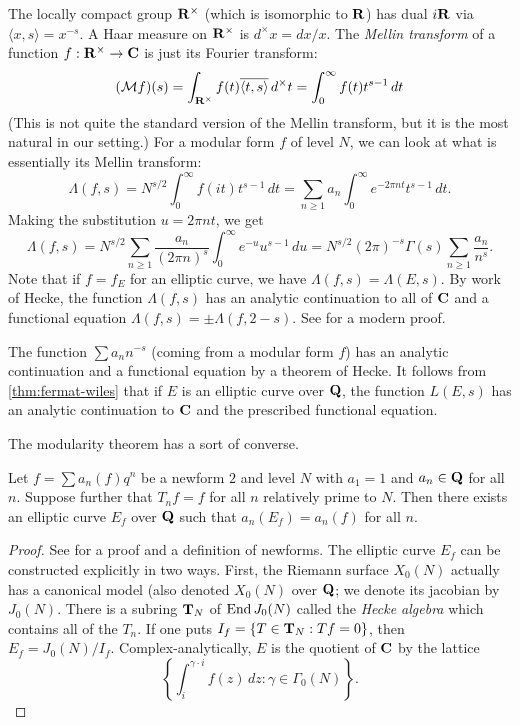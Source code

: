 The locally compact group $\mathbf{R}^\times$ (which is isomorphic to $\mathbf{R}$) has 
dual $i\mathbf{R}$ via $\langle x,s\rangle = x^{-s}$. A Haar measure on 
$\mathbf{R}^\times$ is $d^\times x=dx/x$. The \emph{Mellin transform} 
of a function $f:\mathbf{R}^\times\to \mathbf{C}$ is just its Fourier transform:
\[
  (\mathcal{M} f)(s) 
    = \int_{\mathbf{R}^\times} f(t) \overline{\langle t,s\rangle}\, d^\times t
    = \int_0^\infty f(t) t^{s-1}\, dt
\]
(This is not quite the standard version of the Mellin transform, but it is the 
most natural in our setting.) For a modular form $f$ of level $N$, we can look 
at what is essentially its Mellin transform: 
\[
  \Lambda(f,s) 
    = N^{s/2}\int_0^\infty f(i t) t^{s-1}\, dt  
    = \sum_{n\geqslant 1} a_n \int_0^\infty e^{-2\pi n t} t^{s-1}\,dt \text{.}
\]
Making the substitution $u=2\pi n t$, we get 
\[
  \Lambda(f,s) 
    = N^{s/2} \sum_{n\geqslant 1} \frac{a_n}{(2\pi n)^s} \int_0^\infty e^{-u} u^{s-1}\, du
    = N^{s/2}(2\pi)^{-s} \Gamma(s) \sum_{n\geqslant 1} \frac{a_n}{n^s} \text{.}
\]
Note that if $f=f_E$ for an elliptic curve, we have 
$\Lambda(f,s) = \Lambda(E,s)$. By work of Hecke, the function $\Lambda(f,s)$ 
has an analytic continuation to all of $\mathbf{C}$ and a functional equation 
$\Lambda(f,s) = \pm \Lambda(f,2-s)$. See \cite[VII.9.8]{kn92} for a modern 
proof.  


The function $\sum a_n n^{-s}$ (coming from a modular form $f$) has an analytic 
continuation and a functional equation by a theorem of Hecke. It follows from 
\autoref{thm:fermat-wiles} that if $E$ is an elliptic curve over $\mathbf{Q}$, 
the function $L(E,s)$ has an analytic continuation to $\mathbf{C}$ and the prescribed 
functional equation. 

The modularity theorem has a sort of converse. 

\begin{theorem}
Let $f=\sum a_n(f) q^n$ be a newform $2$ and level $N$ with 
$a_1=1$ and $a_n\in \mathbf{Q}$ for all $n$. Suppose further that 
$T_n f = f$ for all $n$ relatively prime to $N$. Then there exists an 
elliptic curve $E_f$ over $\mathbf{Q}$ such that $a_n(E_f) = a_n(f)$ for all $n$. 
\end{theorem}
\begin{proof}
See \cite[XI.11]{kn92} for a proof and a definition of newforms. The elliptic 
curve $E_f$ can be constructed explicitly in two ways. First, the Riemann 
surface $X_0(N)$ actually has a canonical model (also denoted $X_0(N)$ over 
$\mathbf{Q}$; we denote its jacobian by $J_0(N)$. There is a subring $\mathbf{T}_N$ of 
$\operatorname{End} J_0(N)$ called the \emph{Hecke algebra} which contains all of the 
$T_n$. If one puts $I_f = \{T\in \mathbf{T}_N:T f=0\}$, then 
$E_f=J_0(N)/I_f$. Complex-analytically, $E$ is the quotient of $\mathbf{C}$ by 
the lattice 
\[
  \left\{ \int_i^{\gamma\cdot i} f(z)\, dz : \gamma\in \Gamma_0(N)\right\} \text{.}
\]
\end{proof}





